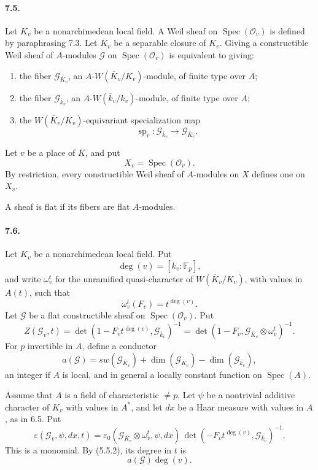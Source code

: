 \documentclass[10pt]{article}
\newcommand{\F}{\mathbb F}
\newcommand{\Spec}{\operatorname{Spec}}
\providecommand{\spc}{\operatorname{sp}}
\providecommand{\Spec}{\operatorname{Spec}}
\providecommand{\spc}{\operatorname{sp}}
\providecommand{\Spec}{\operatorname{Spec}}
\providecommand{\Spec}{\operatorname{Spec}}
\providecommand{\spc}{\operatorname{sp}}
\begin{document}
\paragraph{7.5.} Let \(K_v\) be a nonarchimedean local field. A Weil sheaf on \(\Spec(\mathcal O_v)\) is defined by paraphrasing 7.3. Let \(\overline K_v\) be a separable closure of \(K_v\). Giving a constructible Weil sheaf of \(A\)-modules \(\mathcal G\) on \(\Spec(\mathcal O_v)\) is equivalent to giving:
\begin{enumerate}[label=\alph*)]
\item the fiber \(\mathcal G_{\overline K_v}\), an \(A\)-\(W(\overline K_v/K_v)\)-module, of finite type over \(A\);
\item the fiber \(\mathcal G_{\overline k_v}\), an \(A\)-\(W(\overline k_v/k_v)\)-module, of finite type over \(A\);
\item the \(W(\overline K_v/K_v)\)-equivariant specialization map
\[
\spc_v:\mathcal G_{\overline k_v}\longrightarrow\mathcal G_{\overline K_v}.
\]
\end{enumerate}
Let \(v\) be a place of \(K\), and put
\[
X_v=\Spec(\mathcal O_v).
\]
By restriction, every constructible Weil sheaf of \(A\)-modules on \(X\) defines one on \(X_v\).

A sheaf is flat if its fibers are flat \(A\)-modules.

\paragraph{7.6.} Let \(K_v\) be a nonarchimedean local field. Put
\[
\deg(v)=[k_v:\F_p],
\]
and write \(\omega_v^t\) for the unramified quasi-character of \(W(\overline K_v/K_v)\), with values in \(A(t)\), such that
\[
\omega_v^t(F_v)=t^{\deg(v)}.
\]
Let \(\mathcal G\) be a flat constructible sheaf on \(\Spec(\mathcal O_v)\). Put
\[
\tag{7.6.1}
Z(\mathcal G_v,t)
=
\det(1-F_vt^{\deg(v)},\mathcal G_{\overline k_v})^{-1}
=
\det(1-F_v,\mathcal G_{\overline K_v}\otimes\omega_v^t)^{-1}.
\]
For \(p\) invertible in \(A\), define a conductor
\[
\tag{7.6.2}
a(\mathcal G)=sw(\mathcal G_{\overline K_v})+
\dim(\mathcal G_{\overline K_v})-\dim(\mathcal G_{\overline k_v}),
\]
an integer if \(A\) is local, and in general a locally constant function on \(\Spec(A)\).

Assume that \(A\) is a field of characteristic \(\ne p\). Let \(\psi\) be a nontrivial additive character of \(K_v\) with values in \(A^*\), and let \(dx\) be a Haar measure with values in \(A\), as in 6.5. Put
\[
\tag{7.6.3}
\varepsilon(\mathcal G_v,\psi,dx,t)
=
\varepsilon_0(\mathcal G_{\overline K_v}\otimes\omega_v^t,\psi,dx)\,
\det(-F_vt^{\deg(v)},\mathcal G_{\overline k_v})^{-1}.
\]
This is a monomial. By (5.5.2), its degree in \(t\) is
\[
a(\mathcal G)\deg(v).
\]
\end{document}

